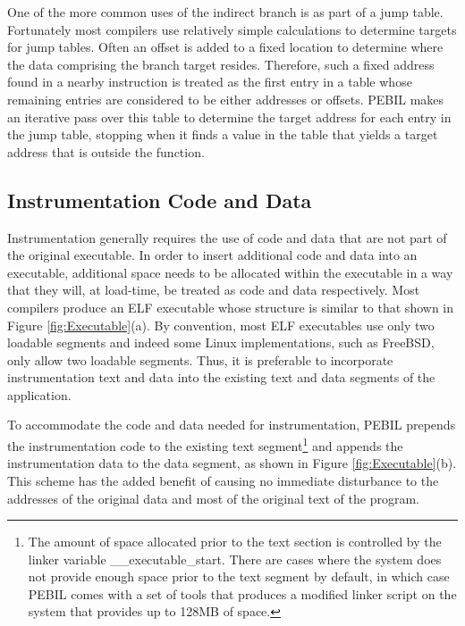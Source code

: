 One of the more common uses of the indirect branch is as part of a jump table. 
Fortunately most compilers use relatively simple calculations to determine targets for jump tables. 
Often an offset is added to a fixed location to determine where the data comprising the branch target
resides. Therefore, such a fixed address found in a nearby instruction 
is treated as the first entry in a table whose remaining entries are considered to be either addresses or offsets.
PEBIL makes an iterative pass over this table to determine the target 
address for each entry in the jump table, stopping when it finds a value in the
table that yields a target address that is outside the function.

\subsection{Instrumentation Code and Data}

Instrumentation generally requires the use of code and data that are not part of the original
executable. In order to insert additional code
and data into an executable, additional space needs to be allocated within the executable in a way that they
will, at load-time, be treated as code and data respectively. Most compilers produce an ELF executable whose
structure is similar to that shown in Figure \ref{fig:Executable}(a). By
convention, most ELF executables use only two loadable segments and indeed some Linux
implementations, such as FreeBSD, only allow two loadable segments. Thus, it is
preferable to incorporate instrumentation text and data into the
existing text and data segments of the application. 

To accommodate the code and data needed for instrumentation, PEBIL prepends the instrumentation code to the existing text
segment\footnote{The amount of space allocated prior to the text section is
controlled by the linker variable \_\_executable\_start. There are cases
where the system does not provide enough space prior to the text segment by
default, in which case PEBIL comes with a set of tools that produces a modified linker
script on the system that provides up to 128MB of space.} and appends the instrumentation data to the
data segment, as shown in Figure \ref{fig:Executable}(b). This
scheme has the added benefit of causing no immediate disturbance to the
addresses of the original data and most of the original text of the program.

